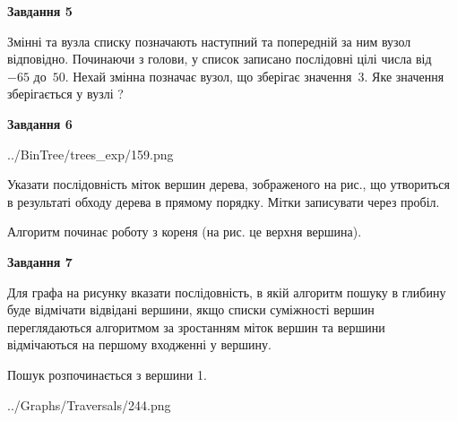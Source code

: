 \documentclass[12pt, ukrainian]{article}
\begin{document}
{\begin {large}
{\begin {center}\textbf{Завдання 5}\end {center}}\par
Змінні  та  вузла списку позначають наступний та попередній за ним вузол відповідно. Починаючи з голови, у список записано послідовні цілі числа від~$-65$ до~$50$. Нехай змінна  позначає вузол, що зберігає значення~$3$.
Яке значення зберігається у вузлі  ?\par
\newpage

{\begin {center}\textbf{Завдання 6}\end {center}}\par

\begin{center}
	{../BinTree/trees_exp/159.png}
\end{center}
Указати послідовність міток вершин дерева, зображеного на рис., що утвориться в результаті обходу дерева в прямому порядку. Мітки записувати через пробіл.\par Алгоритм починає роботу з кореня (на рис. це верхня вершина).\par
\newpage

{\begin {center}\textbf{Завдання 7}\end {center}}\par
Для графа на рисунку вказати послідовність, в якій алгоритм пошуку в глибину буде відмічати відвідані вершини, якщо списки суміжності вершин переглядаються алгоритмом за зростанням міток вершин та вершини відмічаються на першому вход\-женні у вершину.\par
Пошук розпочинається з вершини 1.\par

\begin{center}
	{../Graphs/Traversals/244.png}
\end{center}\par
\newpage


\end{large}}
\end{document}
